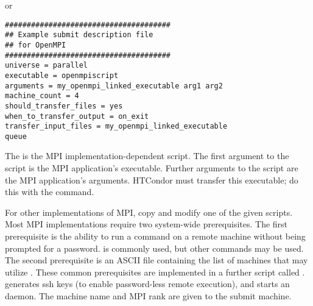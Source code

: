 or

\begin{verbatim}
######################################
## Example submit description file
## for OpenMPI
######################################
universe = parallel
executable = openmpiscript
arguments = my_openmpi_linked_executable arg1 arg2
machine_count = 4
should_transfer_files = yes
when_to_transfer_output = on_exit
transfer_input_files = my_openmpi_linked_executable
queue
\end{verbatim}

The  is the MPI implementation-dependent script.
The first argument to the script is the MPI application's 
executable.
Further arguments to the script are the MPI application's arguments.
HTCondor must transfer this executable;
do this with the  command.

For other implementations of MPI,
copy and modify one of the given scripts.
Most MPI implementations require two system-wide prerequisites.
The first prerequisite is the ability to run a command
on a remote machine without being prompted for a password.
 is commonly used, but other
commands may be used.
The second prerequisite is an ASCII file containing the
list of machines that may utilize .
These common prerequisites are implemented in a further script
called .
 generates ssh keys 
(to enable password-less remote execution),
and starts an  daemon.
The machine name and MPI rank are given to the submit machine.


